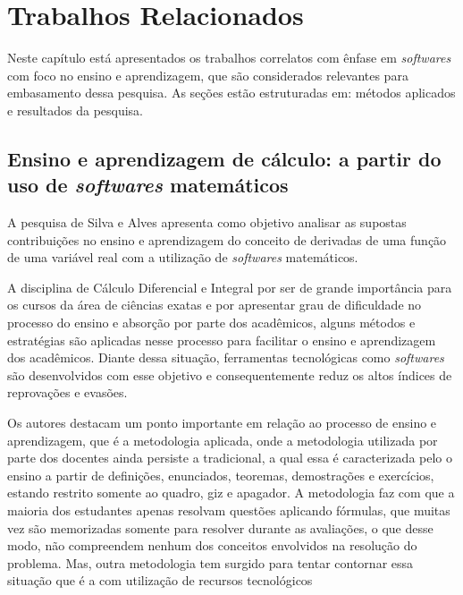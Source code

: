 \chapter{Trabalhos Relacionados}
\label{cap:trabalhos}

\noindent Neste capítulo está apresentados os trabalhos correlatos com ênfase em \textit{softwares} com foco no ensino e aprendizagem, que são considerados relevantes para embasamento dessa pesquisa. As seções estão estruturadas em: métodos aplicados e resultados da pesquisa.

\section{Ensino e aprendizagem de cálculo: a partir do uso de \textit{softwares} matemáticos}

\noindent A pesquisa de Silva e Alves \cite{2016:Santana} apresenta como objetivo analisar as supostas contribuições no ensino e aprendizagem do conceito de derivadas de uma função de uma variável real com a utilização de \textit{softwares} matemáticos.

A disciplina de Cálculo Diferencial e Integral por ser de grande importância para os cursos da área de ciências exatas e por apresentar grau de dificuldade no processo do ensino e absorção por parte dos acadêmicos, alguns métodos e estratégias são aplicadas nesse processo para facilitar o ensino e aprendizagem dos acadêmicos. Diante dessa situação, ferramentas tecnológicas como \textit{softwares} são desenvolvidos com esse objetivo e consequentemente reduz os altos índices de reprovações e evasões. 

Os autores destacam um ponto importante em relação ao processo de ensino e aprendizagem, que é a metodologia aplicada, onde a metodologia utilizada por parte dos docentes ainda persiste a tradicional, a qual essa é caracterizada pelo o ensino a partir de definições, enunciados, teoremas, demostrações e exercícios, estando restrito somente ao quadro, giz e apagador. A metodologia faz com que a maioria dos estudantes apenas resolvam questões aplicando fórmulas, que muitas vez são memorizadas somente para resolver durante as avaliações, o que desse modo, não compreendem nenhum dos conceitos envolvidos na resolução do problema. Mas, outra metodologia tem surgido para tentar contornar essa situação que é a com utilização de recursos tecnológicos


